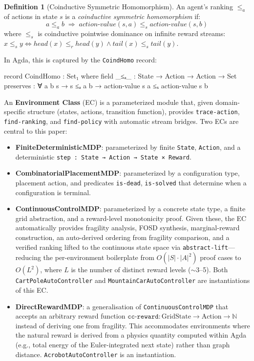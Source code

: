\documentclass[9pt,a4paper]{article}
\theoremstyle{plain}
\theoremstyle{definition}
\newtheorem{definition}{Definition}
\theoremstyle{remark}
\begin{document}
\begin{definition}[Coinductive Symmetric Homomorphism]
An agent's ranking $\le_a$ of actions in state $s$ is a \emph{coinductive symmetric homomorphism} if:
\[
a \le_a b \;\Longrightarrow\; \mathit{action\text{-}value}(s, a) \le_s \mathit{action\text{-}value}(s, b)
\]
where $\le_s$ is coinductive pointwise dominance on infinite reward streams: $x \le_s y \iff \mathit{head}(x) \le_r \mathit{head}(y) \wedge \mathit{tail}(x) \le_s \mathit{tail}(y)$.
\end{definition}

\noindent In Agda, this is captured by the \texttt{CoindHomo} record:

\begin{spec}
record CoindHomo : Set₁ where
  field
    _≤ₐ_     : State → Action → Action → Set
    preserves : ∀ a b s → s ≤ₐ a b → action-value s a ≤ₛ action-value s b
\end{spec}

\noindent An \textbf{Environment Class} (EC) is a parameterized module that, given domain-specific structure (states, actions, transition function), provides \texttt{trace-action}, \texttt{find-ranking}, and \texttt{find-policy} with automatic stream bridges.  Two ECs are central to this paper:

\begin{itemize}
\item \textbf{FiniteDeterministicMDP}: parameterized by finite \texttt{State}, \texttt{Action}, and a deterministic \texttt{step : State → Action → State × Reward}.
\item \textbf{CombinatorialPlacementMDP}: parameterized by a configuration type, placement action, and predicates \texttt{is-dead}, \texttt{is-solved} that determine when a configuration is terminal.
\item \textbf{ContinuousControlMDP}: parameterized by a concrete state type, a finite grid abstraction, and a reward-level monotonicity proof.  Given these, the EC automatically provides fragility analysis, FOSD synthesis, marginal-reward construction, an auto-derived ordering from fragility comparison, and a verified ranking lifted to the continuous state space via \texttt{abstract-lift}---reducing the per-environment boilerplate from $O(|S| \cdot |A|^2)$ proof cases to $O(L^2)$, where $L$ is the number of distinct reward levels (${\sim}$3--5).  Both \texttt{CartPoleAutoController} and \texttt{MountainCarAutoController} are instantiations of this EC.
\item \textbf{DirectRewardMDP}: a generalisation of \texttt{ContinuousControlMDP} that accepts an arbitrary reward function $\texttt{cc-reward} : \text{GridState} \to \text{Action} \to \mathbb{N}$ instead of deriving one from fragility.  This accommodates environments where the natural reward is derived from a physics quantity computed within Agda (e.g., total energy of the Euler-integrated next state) rather than graph distance.  \texttt{AcrobotAutoController} is an instantiation.
\end{itemize}
\end{document}

